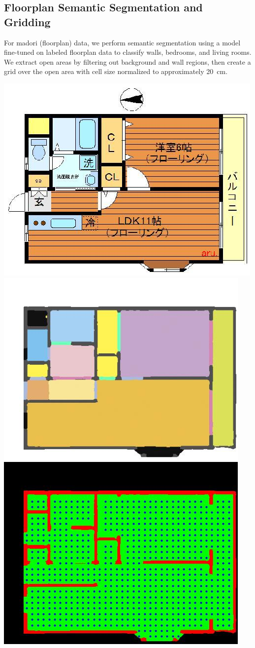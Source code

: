 \documentclass[11pt,a4paper]{article}
\begin{document}
\begin{multicols}{2}
\subsection{Floorplan Semantic Segmentation and Gridding}
For madori (floorplan) data, we perform semantic segmentation using a model fine-tuned 
on labeled floorplan data to classify walls, bedrooms, and living rooms. We extract open areas 
by filtering out background and wall regions, then create a grid over the open area with 
cell size normalized to approximately 20~cm.
\begin{flushleft}
    \includegraphics[width=0.7\columnwidth]{plots/exp_maodri_semseg_raw.jpg}
    \includegraphics[width=0.7\columnwidth]{plots/exp_madori_semseg_decoded.jpg}
    \includegraphics[width=0.7\columnwidth]{plots/exp_madori_semseg_grid.jpg}

\end{flushleft}
\end{multicols}
\end{document}
